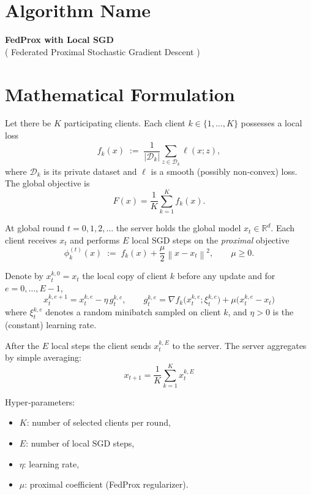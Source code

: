 \documentclass{article}
\newcommand{\norm}[1]{\left\lVert#1\right\rVert}
\begin{document}
\section*{Algorithm Name}
\textbf{FedProx with Local SGD}\\
( Federated Proximal Stochastic Gradient Descent )

\section*{Mathematical Formulation}
Let there be $K$ participating clients.  
Each client $k\in\{1,\dots,K\}$ possesses a local loss
\[
f_k(x)\;:=\;\frac{1}{|\mathcal{D}_k|}\sum_{z\in\mathcal{D}_k}\ell(x;z),
\]
where $\mathcal{D}_k$ is its private dataset and $\ell$ is a smooth (possibly non‑convex) loss.  
The global objective is
\[
F(x)=\frac{1}{K}\sum_{k=1}^{K}f_k(x).
\]

At global round $t=0,1,2,\dots$ the server holds the global model $x_t\in\mathbb{R}^d$.  
Each client receives $x_t$ and performs $E$ local SGD steps on the \emph{proximal} objective
\[
\phi_k^{(t)}(x)\;:=\;f_k(x)+\frac{\mu}{2}\norm{x-x_t}^2,
\qquad \mu\ge 0.
\]

Denote by $x_{t}^{k,0}=x_t$ the local copy of client $k$ before any update and for $e=0,\dots,E-1$,
\[
\boxed{
x_{t}^{k,e+1}=x_{t}^{k,e}-\eta\, g_{t}^{k,e},
\qquad 
g_{t}^{k,e}= \nabla f_k\bigl(x_{t}^{k,e};\xi_{t}^{k,e}\bigr)+\mu\bigl(x_{t}^{k,e}-x_t\bigr)
}
\tag{1}
\]
where $\xi_{t}^{k,e}$ denotes a random minibatch sampled on client $k$, and $\eta>0$ is the (constant) learning rate.

After the $E$ local steps the client sends $x_{t}^{k,E}$ to the server.  
The server aggregates by simple averaging:
\[
\boxed{
x_{t+1}= \frac{1}{K}\sum_{k=1}^{K} x_{t}^{k,E}
}
\tag{2}
\]

Hyper‑parameters:
\begin{itemize}[leftmargin=*]
    \item $K$: number of selected clients per round,
    \item $E$: number of local SGD steps,
    \item $\eta$: learning rate,
    \item $\mu$: proximal coefficient (FedProx regularizer).
\end{itemize}

\end{document}
